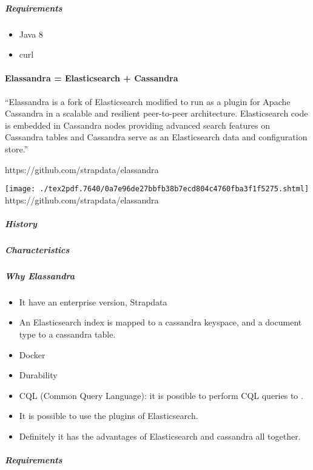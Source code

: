 \documentclass[]{article}
\providecommand{\tightlist}{%
  \setlength{\itemsep}{0pt}\setlength{\parskip}{0pt}}
\let\oldparagraph\paragraph
\renewcommand{\paragraph}[1]{\oldparagraph{#1}\mbox{}}
\let\oldsubparagraph\subparagraph
\renewcommand{\subparagraph}[1]{\oldsubparagraph{#1}\mbox{}}
\begin{document}
\hypertarget{requirements}{%
\subparagraph{Requirements}\label{requirements}}

\begin{itemize}
\tightlist
\item
  Java 8
\item
  curl
\end{itemize}

\hypertarget{elassandra-elasticsearch-cassandra}{%
\paragraph{Elassandra = Elasticsearch +
Cassandra}\label{elassandra-elasticsearch-cassandra}}

``Elassandra is a fork of Elasticsearch modified to run as a plugin for
Apache Cassandra in a scalable and resilient peer-to-peer architecture.
Elasticsearch code is embedded in Cassandra nodes providing advanced
search features on Cassandra tables and Cassandra serve as an
Elasticsearch data and configuration store.''

https://github.com/strapdata/elassandra

\texttt{[image: ./tex2pdf.7640/0a7e96de27bbfb38b7ecd804c4760fba3f1f5275.shtml]}
https://github.com/strapdata/elassandra

\hypertarget{history-1}{%
\subparagraph{History}\label{history-1}}

\hypertarget{characteristics}{%
\subparagraph{Characteristics}\label{characteristics}}

\hypertarget{why-elassandra}{%
\subparagraph{Why Elassandra}\label{why-elassandra}}

\begin{itemize}
\tightlist
\item
  It have an enterprise version, Strapdata
\item
  An Elasticsearch index is mapped to a cassandra keyspace, and a
  document type to a cassandra table.
\item
  Docker
\item
  Durability
\item
  CQL (Common Query Language): it is possible to perform CQL queries to
  .
\item
  It is possible to use the plugins of Elasticsearch.
\item
  Definitely it has the advantages of Elasticsearch and cassandra all
  together.
\end{itemize}

\hypertarget{requirements-1}{%
\subparagraph{Requirements}\label{requirements-1}}
\end{document}
